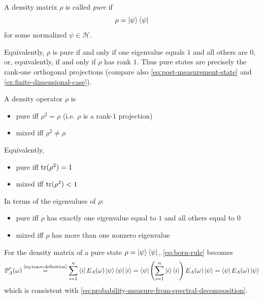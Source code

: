 \begin{definition}\label{def:pure-state-density-matrix}
A density matrix \(\rho\) is called \emph{pure} if
\[
\rho = \ket{\psi}\bra{\psi}
\]
for some normalized \(\psi \in \mathcal H\).
\end{definition}

Equivalently, \(\rho\) is pure if and only if one eigenvalue equals \(1\) and all others are \(0\), or, equivalently, if and only if \(\rho\) has rank \(1\).
Thus pure states are precisely the rank-one orthogonal projections (compare also \autoref{eq:post-measurement-state} and \autoref{ex:finite-dimensional-case}).


\begin{overview}\label{overview:pure-vs-mixed-states}
A density operator $\rho$ is
\begin{itemize}
\item pure iff $\rho^2 = \rho$  (i.e. $\rho$ is a rank-$1$ projection)
\item mixed iff $\rho^2 \neq \rho$
\end{itemize}
Equivalently,
\begin{itemize}
\item pure iff $\operatorname{tr}(\rho^2) = 1$
\item mixed iff $\operatorname{tr}(\rho^2) < 1$
\end{itemize}
In terms of the eigenvalues of $\rho$:
\begin{itemize}
\item pure iff $\rho$ has exactly one eigenvalue equal to $1$ and all others equal to $0$
\item mixed iff $\rho$ has more than one nonzero eigenvalue \qedhere
\end{itemize}
\end{overview}



For the density matrix of a pure state \(\rho = \ket{\psi}\bra{\psi}\), 
\eqref{eq:born-rule} becomes
\[
\operatorname{\mathbb{P}}_A^{\rho}(\omega)
\overset{\text{\eqref{eq:trace-definition}}}{=}
\sum_{i=1}^n \bra{i} E_A(\omega) \ket{\psi}\bra{\psi} \ket{i} 
=
\bra{\psi} \left(\sum_{i=1}^n \ket{i}\bra{i}\right) E_A(\omega) \ket{\psi}
=
\bra{\psi} E_A(\omega) \ket{\psi}
\]
which is consistent with \eqref{eq:probability-measure-from-spectral-decomposition}.

